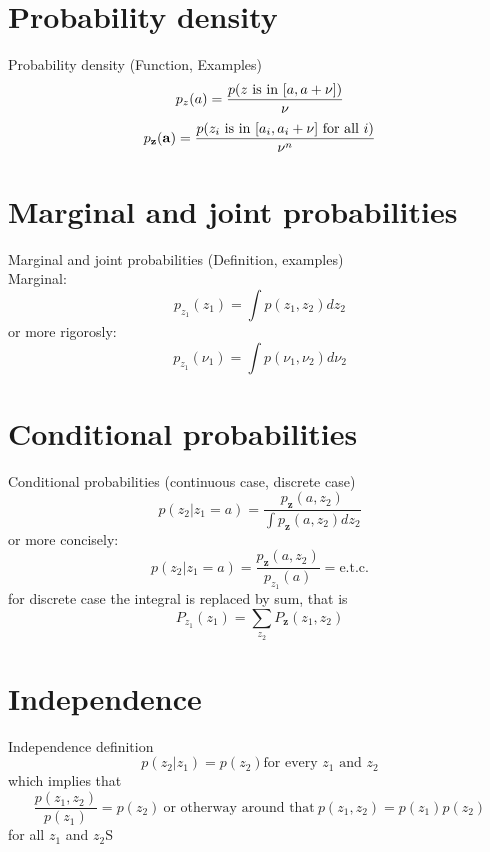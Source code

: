 \documentclass{beamer}
\begin{document}
\section{Probability density}

\begin{frame}{Probability density}
  (Function, Examples)
  \[ p_z(a) = \frac{p(\textnormal{$z$ is in $[a, a + \nu]$})}{\nu}\]
  \[ p_{\mathbf{z}}(\mathbf{a}) =
  \frac{p(\textnormal{$z_i$ is in $[a_i, a_i + \nu]$ for all $i$})}{\nu^n}\]
\end{frame}

\section{Marginal and joint probabilities}

\begin{frame}{Marginal and joint probabilities}
  (Definition, examples)\\
  Marginal:
  \[ p_{z_1}(z_1) =  \int p(z_1, z_2)dz_2\]
  or more rigorosly:
  \[ p_{z_1}(\nu_1) =  \int p(\nu_1, \nu_2)d\nu_2\]
\end{frame}

\section{Conditional probabilities}

\begin{frame}{Conditional probabilities}
  (continuous case, discrete case)
  \[
  p(z_2|z_1 = a) =
  \frac{ p_{\mathbf{z}}(a, z_2)}{\int p_{\mathbf{z}}(a, z_2)dz_2}
  \]
  or more concisely:
  \[
  p(z_2|z_1 = a) =
  \frac{ p_{\mathbf{z}}(a, z_2)}{p_{z_1}(a)} = \text{e.t.c.}
  \]
  for discrete case the integral is replaced by sum, that is
  \[ P_{z_1}(z_1) = \sum_{z_2}P_{\mathbf{z}}(z_1, z_2)\]
\end{frame}

\section{Independence}

\begin{frame}{Independence}
  definition
  \[
  p(z_2|z_1) = p(z_2) \text{for every $z_1$ and $z_2$}
  \]
  which implies that
  \[
  \frac{p(z_1, z_2)}{p(z_1)} = p(z_2) \ \text{or otherway around that} \ p(z_1, z_2) = p(z_1)p(z_2)
  \]
  for all $z_1$ and $z_2$S
\end{frame}
\end{document}
